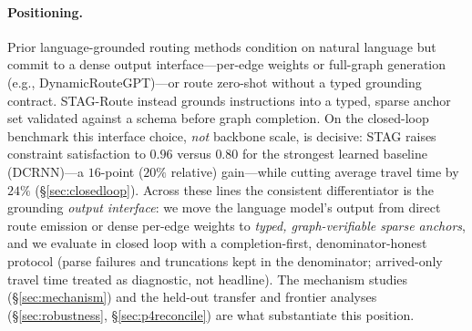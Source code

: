 \paragraph{Positioning.}
Prior language-grounded routing methods condition on natural language but commit to a dense output
interface---per-edge weights or full-graph generation (e.g., DynamicRouteGPT)---or route zero-shot without
a typed grounding contract. STAG-Route instead grounds instructions into a typed, sparse anchor set
validated against a schema before graph completion. On the closed-loop benchmark this interface choice,
\emph{not} backbone scale, is decisive: STAG raises constraint satisfaction to $0.96$ versus $0.80$ for
the strongest learned baseline (DCRNN)---a $16$-point ($20\%$ relative) gain---while cutting average
travel time by $24\%$ (\S\ref{sec:closedloop}).
Across these lines the consistent differentiator is the grounding \emph{output interface}: we move the
language model's output from direct route emission or dense per-edge weights to \emph{typed,
graph-verifiable sparse anchors}, and we evaluate in closed loop with a completion-first,
denominator-honest protocol (parse failures and truncations kept in the denominator; arrived-only travel
time treated as diagnostic, not headline). The mechanism studies (\S\ref{sec:mechanism}) and the held-out
transfer and frontier analyses (\S\ref{sec:robustness}, \S\ref{sec:p4reconcile}) are what substantiate
this position.

